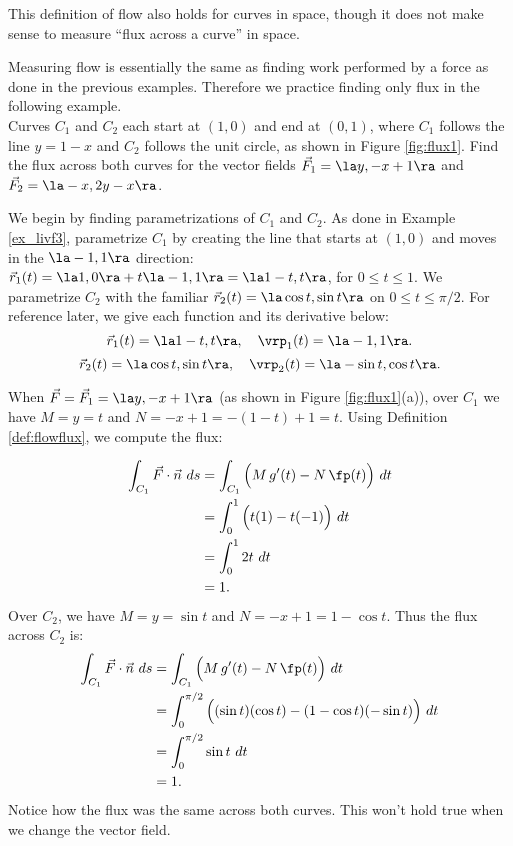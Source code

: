 This definition of flow also holds for curves in space, though it does not make sense to measure ``flux across a curve'' in space.

Measuring flow is essentially the same as finding work performed by a force as done in the previous examples. Therefore we practice finding only flux in the following example.\\

{Curves $C_1$ and $C_2$ each start at $(1,0)$ and end at $(0,1)$, where $C_1$ follows the line $y=1-x$ and $C_2$ follows the unit circle, as shown in Figure \ref{fig:flux1}. Find the flux across both curves for the vector fields $\vec F_1 = \la y, -x+1\ra$ and $\vec F_2 = \la -x, 2y-x\ra$. 
}
{%
We begin by finding parametrizations of $C_1$ and $C_2$. As done in Example \ref{ex_livf3}, parametrize $C_1$ by creating the line that starts at $(1,0)$ and moves in the $\la -1,1\ra$ direction: $\vec r_1(t) = \la 1,0\ra + t\la -1,1\ra = \la 1-t, t\ra$, for $0\leq t\leq 1$. We parametrize $C_2$ with the familiar $\vec r_2(t) = \la \cos t,\sin t\ra$ on $0\leq t\leq \pi/2$. For reference later, we give each function and its derivative below:
$$ \vec r_1(t) = \la 1-t, t\ra, \quad \vrp_1(t) = \la -1,1\ra.$$
$$\vec r_2(t) = \la \cos t, \sin t\ra, \quad \vrp_2(t) = \la -\sin t ,\cos t\ra.$$

When $\vec F = \vec F_1 = \la y, -x+1\ra$ (as shown in Figure \ref{fig:flux1}(a)), over $C_1$ we have $M = y =t$ and $N = -x+1 = -(1-t)+1 = t$. Using Definition \ref{def:flowflux}, we compute the flux:

\begin{align*}
\int_{C_1} \vec F\cdot \vec n\ ds & = \int_{C_1} \Big(M\,g'(t) - N\,\fp(t)\Big)\ dt\\
			&= \int_0^1 \Big( t(1) - t(-1)\Big)\ dt \\
			&= \int_0^1 2t\ dt\\
			&= 1.
\end{align*}
Over $C_2$, we have $M = y = \sin t$ and $N = -x+1 = 1-\cos t$. Thus the flux across $C_2$ is:
\begin{align*}
\int_{C_1} \vec F\cdot \vec n\ ds & = \int_{C_1} \Big(M\,g'(t) - N\,\fp(t)\Big)\ dt\\
				&= \int_0^{\pi/2}\Big((\sin t)(\cos t) - (1-\cos t)(-\sin t)\Big)\ dt\\
				&= \int_0^{\pi/2} \sin t\ dt\\
				&=1.
\end{align*}
Notice how the flux was the same across both curves. This won't hold true when we change the vector field.
\drawexampleline%

}
